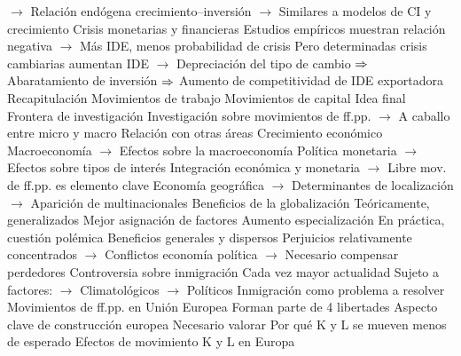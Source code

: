 \documentclass{nuevotema}
\begin{document}
\begin{esquemal}
				\4[] $\to$ Relación endógena crecimiento--inversión
				\4[] $\to$ Similares a modelos de CI y crecimiento
				\4 Crisis monetarias y financieras
				\4[] Estudios empíricos muestran relación negativa
				\4[] $\to$ Más IDE, menos probabilidad de crisis
				\4[] Pero determinadas crisis cambiarias aumentan IDE
				\4[] $\to$ Depreciación del tipo de cambio
				\4[] $\Rightarrow$ Abaratamiento de inversión
				\4[] $\Rightarrow$ Aumento de competitividad de IDE exportadora
	\1[] 
		\2 Recapitulación
			\3 Movimientos de trabajo
			\3 Movimientos de capital
		\2 Idea final
			\3 Frontera de investigación
				\4 Investigación sobre movimientos de ff.pp.
				\4[] $\to$ A caballo entre micro y macro
				\4 Relación con otras áreas
				\4[] Crecimiento económico
				\4[] Macroeconomía
				\4[] $\to$ Efectos sobre la macroeconomía
				\4[] Política monetaria
				\4[] $\to$ Efectos sobre tipos de interés
				\4[] Integración económica y monetaria
				\4[] $\to$ Libre mov. de ff.pp. es elemento clave
				\4[] Economía geográfica
				\4[] $\to$ Determinantes de localización
				\4[] $\to$ Aparición de multinacionales
			\3 Beneficios de la globalización
				\4 Teóricamente, generalizados
				\4[] Mejor asignación de factores
				\4[] Aumento especialización
				\4 En práctica, cuestión polémica
				\4[] Beneficios generales y dispersos
				\4[] Perjuicios relativamente concentrados
				\4[] $\to$ Conflictos economía política
				\4[] $\to$ Necesario compensar perdedores
			\3 Controversia sobre inmigración
				\4 Cada vez mayor actualidad
				\4 Sujeto a factores:
				\4[] $\to$ Climatológicos
				\4[] $\to$ Políticos
				\4 Inmigración como problema a resolver
			\3 Movimientos de ff.pp. en Unión Europea
				\4 Forman parte de 4 libertades
				\4 Aspecto clave de construcción europea
				\4 Necesario valorar
				\4[] Por qué K y L se mueven menos de esperado
				\4[] Efectos de movimiento K y L en Europa
\end{esquemal}
\end{document}
